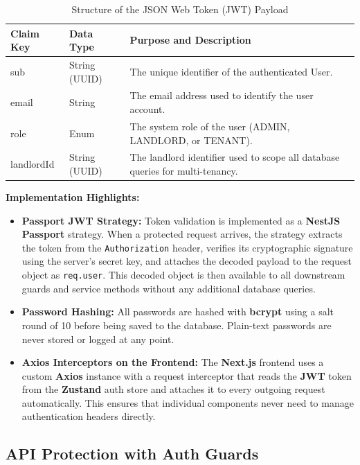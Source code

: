 \begin{table}[H]
    \centering
    \renewcommand{\arraystretch}{1.2}
    \begin{tabular}{|l|l|p{8cm}|}
        \hline
        \textbf{Claim Key} & \textbf{Data Type} & \textbf{Purpose and Description} \\
        \hline
        sub & String (UUID) & The unique identifier of the authenticated User. \\
        \hline
        email & String & The email address used to identify the user account. \\
        \hline
        role & Enum & The system role of the user (ADMIN, LANDLORD, or TENANT). \\
        \hline
        landlordId & String (UUID) & The landlord identifier used to scope all database queries for multi-tenancy. \\
        \hline
    \end{tabular}
    \caption{Structure of the JSON Web Token (JWT) Payload}
    \label{tab:jwt_payload}
\end{table}

\textbf{Implementation Highlights:}
\begin{itemize}
    \item \textbf{Passport JWT Strategy:} Token validation is implemented as a \textbf{NestJS Passport} strategy. When a protected request arrives, the strategy extracts the token from the \texttt{Authorization} header, verifies its cryptographic signature using the server's secret key, and attaches the decoded payload to the request object as \texttt{req.user}. This decoded object is then available to all downstream guards and service methods without any additional database queries.
    \item \textbf{Password Hashing:} All passwords are hashed with \textbf{bcrypt} using a salt round of 10 before being saved to the database. Plain-text passwords are never stored or logged at any point.
    \item \textbf{Axios Interceptors on the Frontend:} The \textbf{Next.js} frontend uses a custom \textbf{Axios} instance with a request interceptor that reads the \textbf{JWT} token from the \textbf{Zustand} auth store and attaches it to every outgoing request automatically. This ensures that individual components never need to manage authentication headers directly.
\end{itemize}

\subsection{API Protection with Auth Guards}

